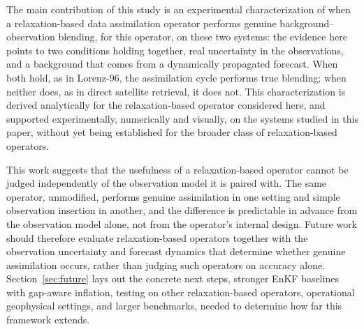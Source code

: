 \documentclass[final,5p,times,twocolumn,authoryear]{elsarticle}
\begin{document}
The main contribution of this study is an experimental
characterization of when a relaxation-based data assimilation
operator performs genuine background--observation blending, for this
operator, on these two systems: the evidence here points to two
conditions holding together, real uncertainty in the observations,
and a background that comes from a dynamically propagated forecast.
When both hold, as in Lorenz-96, the assimilation cycle performs true
blending; when
neither does, as in direct satellite retrieval, it does not. This
characterization is derived analytically for the relaxation-based
operator considered here, and supported experimentally, numerically
and visually, on the systems studied in this paper, without yet being
established for the broader class of relaxation-based operators.

This work suggests that the usefulness of a relaxation-based operator
cannot be judged independently of the observation model it is paired
with. The same operator, unmodified, performs genuine assimilation in
one setting and simple observation insertion in another, and the
difference is predictable in advance from the observation model
alone, not from the operator's internal design. Future work should
therefore evaluate relaxation-based operators together with the
observation uncertainty and forecast dynamics that determine whether
genuine assimilation occurs, rather than judging such operators on
accuracy alone. Section~\ref{sec:future} lays out the concrete next
steps, stronger EnKF baselines with gap-aware inflation, testing on
other relaxation-based operators, operational geophysical settings,
and larger benchmarks, needed to determine how far this framework
extends.

\FloatBarrier
\end{document}
